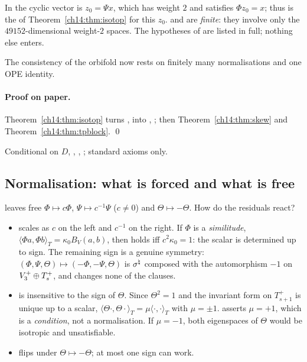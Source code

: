 \begin{dictionary}
In  the cyclic vector is $z_0=\Psi x$, which has weight $2$ and satisfies $\Phi z_0=x$;
thus  is the  of Theorem~\ref{ch14:thm:isotop} for this $z_0$.   and
 are \emph{finite}: they involve only the $49152$-dimensional weight-$2$ spaces.  The
hypotheses of  are listed in full; nothing else enters.
\end{dictionary}
\begin{physics}
The consistency of the orbifold now rests on finitely many normalisations and one OPE identity.
\end{physics}


\paragraph{Proof on paper.}  Theorem~\ref{ch14:thm:isotop} turns ,  into
, ; then Theorem~\ref{ch14:thm:skew} and Theorem~\ref{ch14:thm:tpblock}. \qed

\begin{status}
Conditional on $D$, , , ; standard axioms only.
\end{status}

\subsection{Normalisation: what is forced and what is free}\label{ch14:sec:norm}

 leaves free $\Phi\mapsto c\Phi$, $\Psi\mapsto c^{-1}\Psi$ ($c\ne0$) and $\Theta\mapsto-\Theta$.
How do the residuals react?
\begin{itemize}
\item {} scales as $c$ on the left and $c^{-1}$ on the right.  If $\Phi$ is a
  \emph{similitude}, $\langle\Phi a,\Phi b\rangle_T=\kappa_0B_V(a,b)$, then  holds iff
  $c^2\kappa_0=1$: the scalar is determined up to sign.  The remaining sign is a genuine symmetry:
  $(\Phi,\Psi,\Theta)\mapsto(-\Phi,-\Psi,\Theta)$ is $\sigma^{\natural}$ composed with the automorphism $-1$ on
  $V_3^{+}\oplus T_s^+$, and changes none of the clauses.
\item {} is insensitive to the sign of $\Theta$.  Since $\Theta^2=1$ and the invariant form on
  $T_{s+1}^+$ is unique up to a scalar, $\langle\Theta\cdot,\Theta\cdot\rangle_T=\mu\langle\cdot,\cdot\rangle_T$
  with $\mu=\pm1$.   asserts $\mu=+1$, which is a \emph{condition}, not a normalisation.
  If $\mu=-1$, both eigenspaces of $\Theta$ would be isotropic and  unsatisfiable.
\item {} flips under $\Theta\mapsto-\Theta$; at most one sign can work.
\end{itemize}

